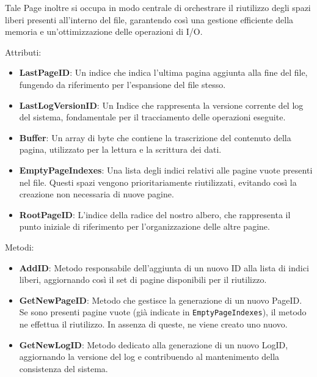 \documentclass[12pt,a4paper,openright,twoside]{book}
\begin{document}
                Tale Page inoltre si occupa in modo centrale di orchestrare il riutilizzo degli spazi liberi presenti all’interno del file, garantendo così una gestione efficiente della memoria e un’ottimizzazione delle operazioni di I/O.

                

                Attributi:
                \begin{itemize}
                    \item \textbf{LastPageID}: Un indice che indica l’ultima pagina aggiunta alla fine del file, fungendo da riferimento per l’espansione del file stesso.
                    \item \textbf{LastLogVersionID}: Un Indice che rappresenta la versione corrente del log del sistema, fondamentale per il tracciamento delle operazioni eseguite.
                    \item \textbf{Buffer}: Un array di byte che contiene la trascrizione del contenuto della pagina, utilizzato per la lettura e la scrittura dei dati.
                    \item \textbf{EmptyPageIndexes}: Una lista degli indici relativi alle pagine vuote presenti nel file.
                    Questi spazi vengono prioritariamente riutilizzati, evitando così la creazione non necessaria di nuove pagine.
                    \item \textbf{RootPageID}: L'indice della radice del nostro albero, che rappresenta il punto iniziale di riferimento per l’organizzazione delle altre pagine.
                \end{itemize}

                Metodi:
                \begin{itemize}
                    \item \textbf{AddID}: Metodo responsabile dell’aggiunta di un nuovo ID alla lista di indici liberi, aggiornando così il set di pagine disponibili per il riutilizzo.
                    \item \textbf{GetNewPageID}: Metodo che gestisce la generazione di un nuovo PageID.
                    Se sono presenti pagine vuote (già indicate in \texttt{EmptyPageIndexes}), il metodo ne effettua il riutilizzo.
                    In assenza di queste, ne viene creato uno nuovo.
                    \item \textbf{GetNewLogID}: Metodo dedicato alla generazione di un nuovo LogID, aggiornando la versione del log e contribuendo al mantenimento della consistenza del sistema.
                \end{itemize}
\end{document}
